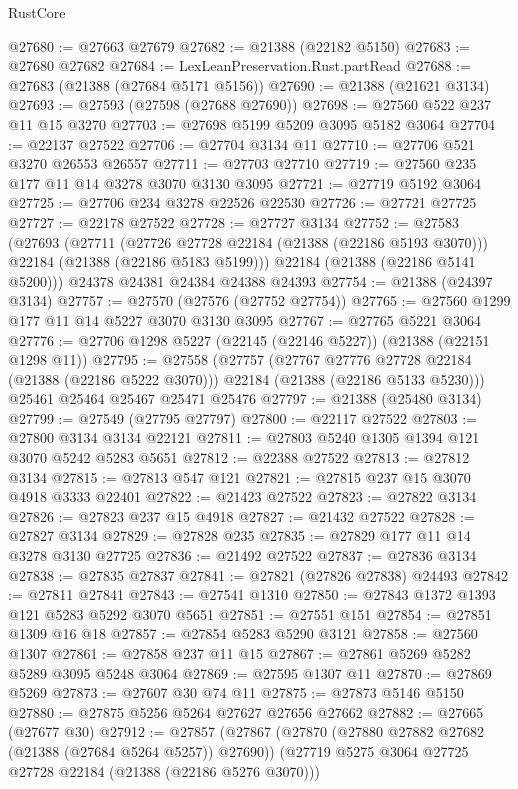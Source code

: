 \begin{lexlean}{RustCore}
\begin{coremodule}
@27680 := @27663 @27679
@27682 := @21388 (@22182 @5150)
@27683 := @27680 @27682
@27684 := LexLeanPreservation.Rust.partRead
@27688 := @27683 (@21388 (@27684 @5171 @5156))
@27690 := @21388 (@21621 @3134)
@27693 := @27593 (@27598 (@27688 @27690))
@27698 := @27560 @522 @237 @11 @15 @3270
@27703 := @27698 @5199 @5209 @3095 @5182 @3064
@27704 := @22137 @27522
@27706 := @27704 @3134 @11
@27710 := @27706 @521 @3270 @26553 @26557
@27711 := @27703 @27710
@27719 := @27560 @235 @177 @11 @14 @3278 @3070 @3130 @3095
@27721 := @27719 @5192 @3064
@27725 := @27706 @234 @3278 @22526 @22530
@27726 := @27721 @27725
@27727 := @22178 @27522
@27728 := @27727 @3134
@27752 := @27583
    (@27693
      (@27711
        (@27726 @27728 @22184 (@21388 (@22186 @5193 @3070)))
        @22184
        (@21388 (@22186 @5183 @5199)))
      @22184
      (@21388 (@22186 @5141 @5200)))
    @24378
    @24381
    @24384
    @24388
    @24393
@27754 := @21388 (@24397 @3134)
@27757 := @27570 (@27576 (@27752 @27754))
@27765 := @27560 @1299 @177 @11 @14 @5227 @3070 @3130 @3095
@27767 := @27765 @5221 @3064
@27776 := @27706 @1298 @5227 (@22145 (@22146 @5227)) (@21388 (@22151 @1298 @11))
@27795 := @27558
    (@27757
      (@27767 @27776 @27728 @22184 (@21388 (@22186 @5222 @3070)))
      @22184
      (@21388 (@22186 @5133 @5230)))
    @25461
    @25464
    @25467
    @25471
    @25476
@27797 := @21388 (@25480 @3134)
@27799 := @27549 (@27795 @27797)
@27800 := @22117 @27522
@27803 := @27800 @3134 @3134 @22121
@27811 := @27803 @5240 @1305 @1394 @121 @3070 @5242 @5283 @5651
@27812 := @22388 @27522
@27813 := @27812 @3134
@27815 := @27813 @547 @121
@27821 := @27815 @237 @15 @3070 @4918 @3333 @22401
@27822 := @21423 @27522
@27823 := @27822 @3134
@27826 := @27823 @237 @15 @4918
@27827 := @21432 @27522
@27828 := @27827 @3134
@27829 := @27828 @235
@27835 := @27829 @177 @11 @14 @3278 @3130 @27725
@27836 := @21492 @27522
@27837 := @27836 @3134
@27838 := @27835 @27837
@27841 := @27821 (@27826 @27838) @24493
@27842 := @27811 @27841
@27843 := @27541 @1310
@27850 := @27843 @1372 @1393 @121 @5283 @5292 @3070 @5651
@27851 := @27551 @151
@27854 := @27851 @1309 @16 @18
@27857 := @27854 @5283 @5290 @3121
@27858 := @27560 @1307
@27861 := @27858 @237 @11 @15
@27867 := @27861 @5269 @5282 @5289 @3095 @5248 @3064
@27869 := @27595 @1307 @11
@27870 := @27869 @5269
@27873 := @27607 @30 @74 @11
@27875 := @27873 @5146 @5150
@27880 := @27875 @5256 @5264 @27627 @27656 @27662
@27882 := @27665 (@27677 @30)
@27912 := @27857
    (@27867
      (@27870 (@27880 @27882 @27682 (@21388 (@27684 @5264 @5257)) @27690))
      (@27719 @5275 @3064 @27725 @27728 @22184 (@21388 (@22186 @5276 @3070)))

\end{coremodule}
\end{lexlean}
